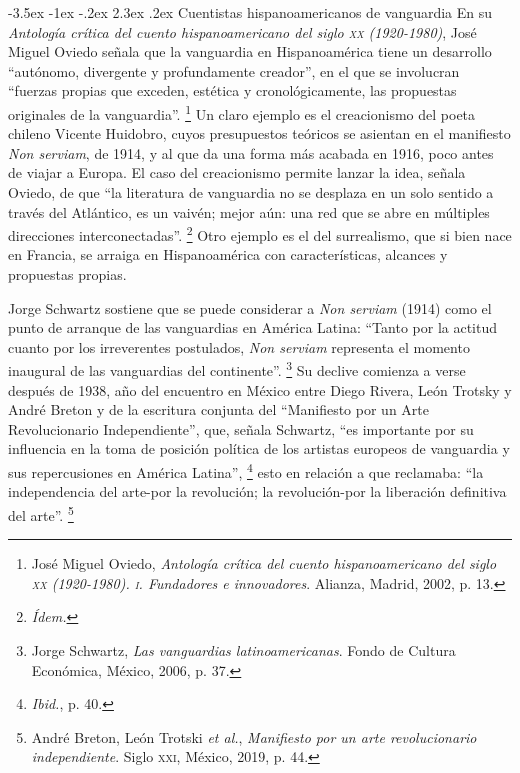 \documentclass[14pt,twoside,final]{extbook} %
\makeatletter
\let\oldfootnote\footnote
\renewcommand\footnote[1]{%
\oldfootnote{\hspace{1mm}#1}}
\renewcommand\section{\@startsection {section}{1}{\z@}%
                                     {-3.5ex \@plus -1ex \@minus -.2ex}%
                                     {2.3ex \@plus .2ex}%
                                     {\normalfont\large\bfseries\sc}}
\makeatother
\begin{document}
\section{Cuentistas hispanoamericanos de vanguardia}\label{sec:cuentistas-hispanoamericanos-de-vanguardia}
En su \emph{Antología crítica del cuento hispanoamericano del siglo \textsc{xx} (1920-1980)}, José Miguel Oviedo señala que la vanguardia en Hispanoamérica tiene un desarrollo ``autónomo, divergente y profundamente creador'', en el que se involucran ``fuerzas propias que exceden, estética y cronológicamente, las propuestas originales de la vanguardia''.\footnote{José Miguel Oviedo, \emph{Antología crítica del cuento hispanoamericano del siglo \textsc{xx} (1920-1980). \textsc{i}. Fundadores e innovadores}. Alianza, Madrid, 2002, p. 13.} Un claro ejemplo es el creacionismo del poeta chileno Vicente Huidobro, cuyos presupuestos teóricos se asientan en el manifiesto \emph{Non serviam}, de 1914, y al que da una forma más acabada en 1916, poco antes de viajar a Europa. El caso del creacionismo permite lanzar la idea, señala Oviedo, de que ``la literatura de vanguardia no se desplaza en un solo sentido a través del Atlántico, es un vaivén; mejor aún: una red que se abre en múltiples direcciones interconectadas''.\footnote{\em Ídem.} Otro ejemplo es el del surrealismo, que si bien nace en Francia, se arraiga en Hispanoamérica con características, alcances y propuestas propias.

Jorge Schwartz sostiene que se puede considerar a \emph{Non serviam} (1914) como el punto de arranque de las vanguardias en América Latina: ``Tanto por la actitud cuanto por los irreverentes postulados, \emph{Non serviam} representa el momento inaugural de las vanguardias del continente''.\footnote{Jorge Schwartz, \emph{Las vanguardias latinoamericanas}. Fondo de Cultura Económica, México, 2006, p. 37.} Su declive comienza a verse después de 1938, año del encuentro en México entre Diego Rivera, León Trotsky y André Breton y de la escritura conjunta del ``Manifiesto por un Arte Revolucionario Independiente'', que, señala Schwartz, ``es importante por su influencia en la toma de posición política de los artistas europeos de vanguardia y sus repercusiones en América Latina'',\footnote{\emph{Ibid.}, p. 40.} esto en relación a que reclamaba: ``la independencia del arte-por la revolución; la revolución-por la liberación definitiva del arte''.\footnote{André Breton, León Trotski \emph{et al.}, \emph{Manifiesto por un arte revolucionario independiente}. Siglo \textsc{xxi}, México, 2019, p. 44.}
\end{document}
